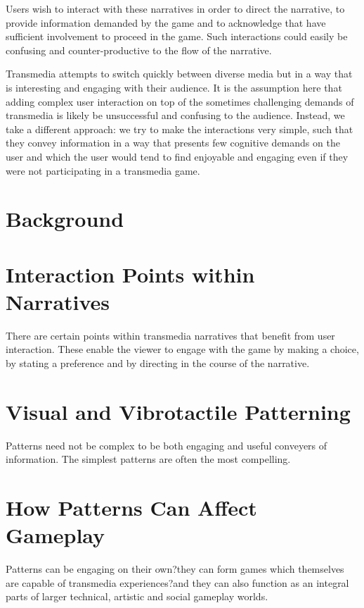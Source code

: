 \documentclass{chi-ext}
\begin{document}
Users wish to interact with these narratives in order to direct the narrative, to provide information demanded by the game and to acknowledge that have sufficient involvement to proceed in the game. Such interactions could easily be confusing and counter-productive to the flow of the narrative. 

Transmedia attempts to switch quickly between diverse media but in a way that is interesting and engaging with their audience. It is the assumption here that adding complex user interaction on top of the sometimes challenging demands of transmedia is likely be unsuccessful and confusing to the audience. Instead, we take a different approach: we try to make the interactions very simple, such that they convey information in a way that presents few cognitive demands on the user and which the user would tend to find enjoyable and engaging even if they were not participating in a transmedia game. 

\section{Background}

\section{Interaction Points within Narratives}
There are certain points within transmedia narratives that benefit from user interaction. These enable the viewer to engage with the game by making a choice, by stating a preference and by directing in the course of the narrative. 


\section{Visual and Vibrotactile Patterning}
Patterns need not be complex to be both engaging and useful conveyers of information. The simplest patterns are often the most compelling. 

\section{How Patterns Can Affect Gameplay}
Patterns can be engaging on their own?they can form games which themselves are capable of transmedia experiences?and they can also function as an integral parts of larger technical, artistic and social gameplay worlds. 
\end{document}
